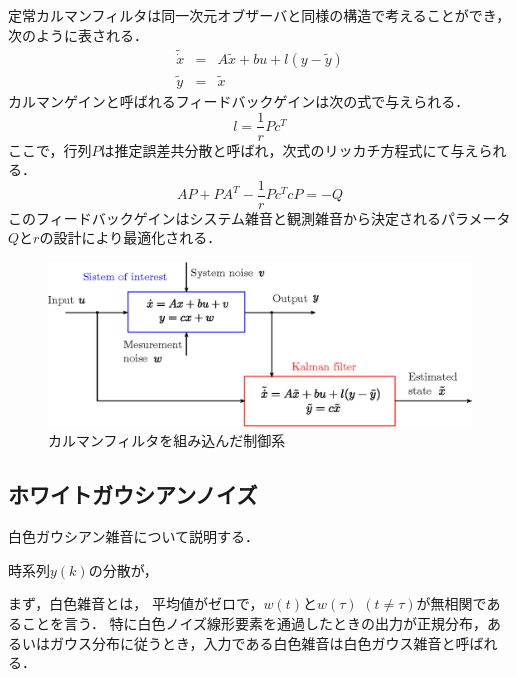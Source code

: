 \documentclass[a4paper,12pt]{jarticle}
\begin{document}
定常カルマンフィルタは同一次元オブザーバと同様の構造で考えることができ，次のように表される．
%
\begin{eqnarray}
 \tilde{\dot{x}} & = &  A \tilde{x} + bu + l ( y - \tilde{y} ) \\
 \tilde{y} & = & \tilde{x}
\end{eqnarray}
%
カルマンゲインと呼ばれるフィードバックゲインは次の式で与えられる．
%
\begin{equation}
 l = \dfrac{1}{r} P c^T
\end{equation}
%
ここで，行列$ P $は推定誤差共分散と呼ばれ，次式のリッカチ方程式にて与えられる．
%
\begin{equation}
 AP + PA^T - \dfrac{1}{r}Pc^TcP = - Q
\label{riccati}
\end{equation}
%
このフィードバックゲインはシステム雑音と観測雑音から決定されるパラメータ$ Q $と$ r $の設計により最適化される．







\begin{figure}[b]
 \begin{center}
  \includegraphics[scale=0.8]{../figure/eps/kalman.eps}
  \caption{カルマンフィルタを組み込んだ制御系}
  \label{kalman}
 \end{center}
\end{figure}
%

\subsection{ホワイトガウシアンノイズ}
%
白色ガウシアン雑音について説明する．

時系列$ y(k) $の分散が，

まず，白色雑音とは，
平均値がゼロで，$ w(t) $と$ w(\tau) $ $ (t \neq \tau ) $が無相関であることを言う．
特に白色ノイズ線形要素を通過したときの出力が正規分布，あるいはガウス分布に従うとき，入力である白色雑音は白色ガウス雑音と呼ばれる．
\end{document}
